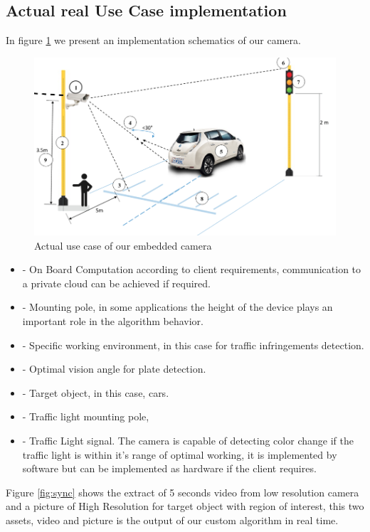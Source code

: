 \documentclass[fleqn,12pt]{SelfArx} %
\begin{document}
\subsection{Actual real Use Case implementation}

In figure \ref{fig:work_dec} we present an implementation schematics of our camera.

\begin{figure}[t]\centering
	\includegraphics[width=\linewidth]{images/lucam}
	\caption{Actual use case of our embedded camera}
	\label{fig:work_dec}
\end{figure}

\begin{itemize}[noitemsep] %

\item[1]- On Board Computation according to client requirements, communication to a private cloud can be achieved if required.
\item[2]- Mounting pole, in some applications the height of the device plays an important role in the algorithm behavior.
\item[3-8]- Specific working environment, in this case for traffic infringements detection.
\item[4]- Optimal vision angle for plate detection.
\item[5]- Target object, in this case, cars.
\item[6]- Traffic light mounting pole,
\item[7]- Traffic Light signal. The camera is capable of detecting color change if the traffic light is within it's range of optimal working, it is implemented by software but can be implemented as hardware if the client requires.
\end{itemize}
Figure \ref{fig:sync} shows the extract of 5 seconds video from low resolution camera and a picture of High Resolution for target object with region of interest, this two assets, video and picture is the output of our custom algorithm in real time.
\end{document}
